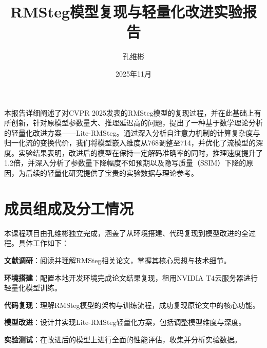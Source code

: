 \documentclass[12pt]{ctexart}
\title{RMSteg模型复现与轻量化改进实验报告}
\author{孔维彬 \qquad 2023040620}
\date{2025年11月}
\renewenvironment{abstract}{%
    \normalsize
    \begin{center}%
        {\bfseries\Large \abstractname\vspace{0.5em}}%
    \end{center}%
    \par
}{%
    \par
}
\begin{document}
\maketitle
\thispagestyle{empty}
\pagestyle{fancy}
\setlength{\headheight}{16.5pt}
\fancyhf{}
\fancyfoot[C]{- \,\thepage\, -}
\renewcommand{\headrule}{\hrule height 1.4pt \vspace{1pt} \hrule height 0.4pt}
\renewcommand{\footrulewidth}{0pt}
\renewcommand{\sectionmark}[1]{\markright{\thesection\ #1}}
\renewcommand{\subsectionmark}[1]{\markright{\thesubsection\ #1}}
\begin{abstract}
本报告详细阐述了对CVPR 2025发表的RMSteg模型的复现过程，并在此基础上有所创新，针对原模型参数量大、推理延迟高的问题，提出了一种基于数学理论分析的轻量化改进方案——Lite-RMSteg。通过深入分析自注意力机制的计算复杂度与归一化流的变换代价，我们将模型嵌入维度从768调整至714，并优化了流模型的深度。实验结果表明，改进后的模型在保持一定解码准确率的同时，推理速度提升了1.2倍，并深入分析了参数量下降幅度不如预期以及隐写质量（SSIM）下降的原因，为后续的轻量化研究提供了宝贵的实验数据与理论参考。
\end{abstract}

\section{成员组成及分工情况}
本课程项目由孔维彬独立完成，涵盖了从环境搭建、代码复现到模型改进的全过程。具体工作如下：

\textbf{文献调研}：阅读并理解RMSteg相关论文，掌握其核心思想与技术细节。

\textbf{环境搭建}：配置本地开发环境完成论文结果复现，租用NVIDIA T4云服务器进行轻量化模型训练。

\textbf{代码复现}：理解RMSteg模型的架构与训练流程，成功复现原论文中的核心功能。

\textbf{模型改进}：设计并实现Lite-RMSteg轻量化方案，包括调整模型维度与深度。

\textbf{实验测试}：在改进后的模型上进行全面的性能评估，收集并分析实验数据。
\end{document}
